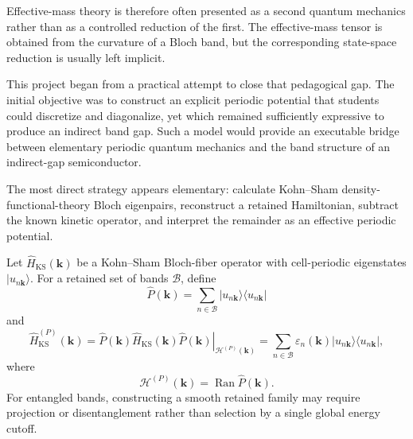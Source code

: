 Effective-mass theory is therefore often presented as a second quantum
mechanics rather than as a controlled reduction of the first. The
effective-mass tensor is obtained from the curvature of a Bloch band, but the
corresponding state-space reduction is usually left implicit.

This project began from a practical attempt to close that pedagogical gap. The
initial objective was to construct an explicit periodic potential that students
could discretize and diagonalize, yet which remained sufficiently expressive
to produce an indirect band gap. Such a model would provide an executable
bridge between elementary periodic quantum mechanics and the band structure of
an indirect-gap semiconductor.

The most direct strategy appears elementary: calculate Kohn--Sham
density-functional-theory Bloch eigenpairs, reconstruct a retained Hamiltonian,
subtract the known kinetic operator, and interpret the remainder as an
effective periodic potential.

Let $\hat H_{\mathrm{KS}}(\mathbf k)$ be a Kohn--Sham Bloch-fiber operator
with cell-periodic eigenstates $\lvert u_{n\mathbf k}\rangle$. For a retained
set of bands $\mathcal B$, define
\begin{equation}
    \hat P(\mathbf k)
    =
    \sum_{n\in\mathcal B}
    \lvert u_{n\mathbf k}\rangle
    \langle u_{n\mathbf k}\rvert
\end{equation}
and
\begin{equation}
    \hat H_{\mathrm{KS}}^{(P)}(\mathbf k)
    =
    \left.
        \hat P(\mathbf k)
        \hat H_{\mathrm{KS}}(\mathbf k)
        \hat P(\mathbf k)
    \right|_{\mathcal H^{(P)}(\mathbf k)}
    =
    \sum_{n\in\mathcal B}
    \varepsilon_n(\mathbf k)
    \lvert u_{n\mathbf k}\rangle
    \langle u_{n\mathbf k}\rvert,
\end{equation}
where
\begin{equation}
    \mathcal H^{(P)}(\mathbf k)
    =
    \operatorname{Ran}\hat P(\mathbf k).
\end{equation}
For entangled bands, constructing a smooth retained family may require
projection or disentanglement rather than selection by a single global energy
cutoff.

